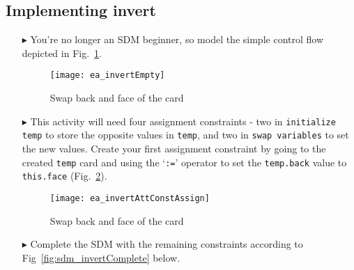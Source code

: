 \newpage
\subsection{Implementing invert}
\visHeader
\hypertarget{invertCard vis}{}

\begin{itemize}

\vspace{0.5cm}

\item[$\blacktriangleright$] You're no longer an SDM beginner, so model the simple control flow depicted in Fig.~\ref{fig:sdm_invertEmpty}. 

\vspace{0.5cm}

\begin{figure}[htbp]
\begin{center}
  \texttt{[image: ea\_invertEmpty]}
  \caption{Swap back and face of the card}  
  \label{fig:sdm_invertEmpty}
\end{center}
\end{figure}

\vspace{0.5cm}

\item[$\blacktriangleright$] This activity will need four assignment constraints - two in \texttt{initialize temp} to store the opposite values in
\texttt{temp}, and two in \texttt{swap variables} to set the new values. Create your first assignment constraint by going to the created \texttt{temp} card and
using the `\texttt{:=}' operator to set the \texttt{temp.back} value to \texttt{this.face} (Fig.~\ref{fig:sdm_invertAssignment}).

\begin{figure}[htbp]
\begin{center}
  \texttt{[image: ea\_invertAttConstAssign]}
  \caption{Swap back and face of the card}  
  \label{fig:sdm_invertAssignment}
\end{center}
\end{figure}

\clearpage

\vspace*{0.5cm}

\item[$\blacktriangleright$] Complete the SDM with the remaining constraints according to Fig~\ref{fig:sdm_invertComplete} below.

\vspace{0.5cm}


\end{itemize}
